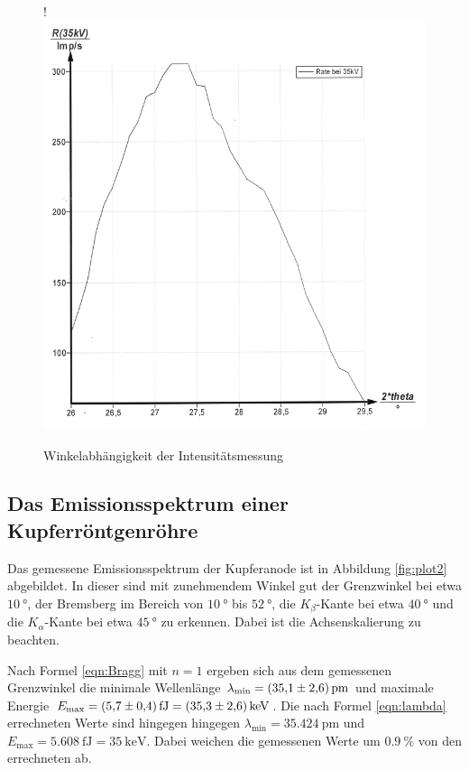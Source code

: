 \begin{figure}[H]!
  \centering
  \includegraphics[scale=0.3]{content/bild1.png}
  \caption{Winkelabhängigkeit der Intensitätsmessung}
  \label{fig:plot1}
\end{figure}

\subsection{Das Emissionsspektrum einer Kupferröntgenröhre}

Das gemessene Emissionsspektrum der Kupferanode ist in Abbildung \ref{fig:plot2} abgebildet.
In dieser sind mit zunehmendem Winkel gut der Grenzwinkel bei etwa $\SI{10}{\degree}$,
der Bremsberg im Bereich von $\SI{10}{\degree}$ bis $\SI{52}{\degree}$, die 
$K_\beta$-Kante bei etwa $\SI{40}{\degree}$ und die $K_\alpha$-Kante bei 
etwa $\SI{45}{\degree}$ zu erkennen. Dabei ist die Achsenskalierung zu beachten.

Nach Formel \eqref{eqn:Bragg} mit $n = 1$ ergeben sich aus dem gemessenen Grenzwinkel die 
minimale Wellenlänge $\lambda_\text{min} = \SI{35.1 +- 2.6}{\pico\meter}$ und maximale
Energie $E_\text{max} = \SI{5.7 +- 0.4}{\femto\joule} = \SI{35.3 +- 2.6}{\kilo\eV}$.
Die nach Formel \eqref{eqn:lambda} errechneten Werte sind hingegen hingegen
$\lambda_\text{min} = \SI{35.424}{\pico\meter}$ und 
$E_\text{max} = \SI{5.608}{\femto\joule} = \SI{35}{\kilo\eV}$.
Dabei weichen die gemessenen Werte um $\SI{0.9}{\percent}$ von den errechneten ab.

